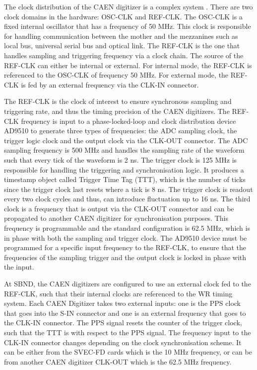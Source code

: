 The clock distribution of the CAEN digitizer is a complex system \cite{}.
There are two clock domains in the hardware: OSC-CLK and REF-CLK.
The OSC-CLK is a fixed internal oscillator that has a frequency of 50 MHz. 
This clock is responsible for handling communication between the mother and the mezzanines such as local bus, universal serial bus and optical link.
The REF-CLK is the one that handles sampling and triggering frequency via a clock chain.
The source of the REF-CLK can either be internal or external.
For internal mode, the REF-CLK is referenced to the OSC-CLK of frequency 50 MHz.
For external mode, the REF-CLK is fed by an external frequency via the CLK-IN connector. 

The REF-CLK is the clock of interest to ensure synchronous sampling and triggering rate, and thus the timing precision of the CAEN digitizers.
The REF-CLK frequency is input to a phase-locked-loop and clock distribution device AD9510 to generate three types of frequencies: the ADC sampling clock, the trigger logic clock and the output clock via the CLK-OUT connector.
The ADC sampling frequency is 500 MHz and handles the sampling rate of the waveform such that every tick of the waveform is 2 ns. 
The trigger clock is 125 MHz is responsible for handling the triggering and synchronisation logic.
It produces a timestamp object called Trigger Time Tag (TTT), which is the number of ticks since the trigger clock last resets where a tick is 8 ns.
The trigger clock is readout every two clock cycles and thus, can introduce fluctuation up to 16 ns.
The third clock is a frequency that is output via the CLK-OUT connector and can be propagated to another CAEN digitizer for synchronisation purposes.
This frequency is programmable and the standard configuration is 62.5 MHz, which is in phase with both the sampling and trigger clock.
The AD9510 device must be programmed for a specific input frequency to the REF-CLK, to ensure that the frequencies of the sampling trigger and the output clock is locked in phase with the input.

At SBND, the CAEN digitizers are configured to use an external clock fed to the REF-CLK, such that their internal clocks are referenced to the WR timing system. 
Each CAEN Digitizer takes two external inputs: one is the PPS clock that goes into the S-IN connector and one is an external frequency that goes to the CLK-IN connector.
The PPS signal resets the counter of the trigger clock, such that the TTT is with respect to the PPS signal.
The frequency input to the CLK-IN connector changes depending on the clock synchronisation scheme. 
It can be either from the SVEC-FD cards which is the 10 MHz frequency, or can be from another CAEN digitizer CLK-OUT which is the 62.5 MHz frequency.

